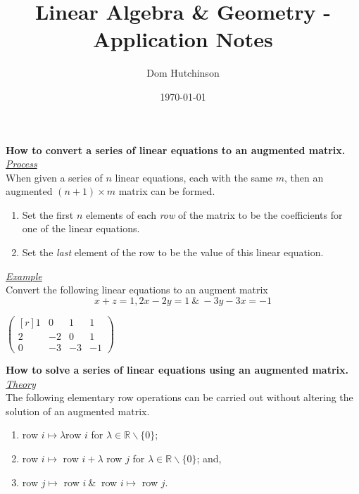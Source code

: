 \documentclass[11pt,a4paper]{article}
\begin{document}
\pagestyle{fancy}
\setlength\parindent{0pt}
\allowdisplaybreaks

\renewcommand{\headrulewidth}{0pt}
\newcommand{\vect}[1]{\boldsymbol{#1}}
\newcommand{\dotprod}[0]{\boldsymbol{\cdot}}
\newcommand{\real}[0]{\mathbb{R}}
\newcommand{\field}[0]{\mathbb{F}}
\newcommand{\complex}[0]{\mathbb{C}}
\newcommand{\innerproduct}[2]{\langle #1, #2 \rangle}

\title{Linear Algebra \& Geometry - Application Notes}
\author{Dom Hutchinson}
\date{\today}
\maketitle

\fancyhead[R]{\today}

\textbf{How to convert a series of linear equations to an augmented matrix.}\\

\underline{\textit{Process}}\\
When given a series of $n$ linear equations, each with the same $m$, then an augmented $(n+1) \times m$ matrix can be formed.
\begin{enumerate}[label=\roman*)]
  \itemsep0em
  \item Set the first $n$ elements of each \textit{row} of the matrix to be the coefficients for one of the linear equations.
  \item Set the \textit{last} element of the row to be the value of this linear equation.
\end{enumerate}

\underline{\textit{Example}}\\
Convert the following linear equations to an augment matrix
$$x + z = 1, 2x - 2y = 1\ \&\ - 3y - 3x = -1$$
\begin{center}$\begin{pmatrix*}[r] 1 & 0 & 1 & 1 \\ 2 & -2 & 0 & 1 \\ 0 & -3 & -3 & -1\end{pmatrix*}$\end{center}

\textbf{How to solve a series of linear equations using an augmented matrix.}\\

\underline{\textit{Theory}}\\
The following elementary row operations can be carried out without altering the solution of an augmented matrix.
\begin{enumerate}[label=\roman*)]
  \itemsep0em
  \item row $i \mapsto \lambda$row $i$ for $\lambda \in \real\backslash \{0\}$;
  \item row $i \mapsto$ row $i + \lambda$ row $j$ for $\lambda \in \real\backslash \{0\}$; and,
  \item row $j \mapsto$ row $i\ \&\ $ row $i \mapsto$ row $j$.
\end{enumerate}
\end{document}
